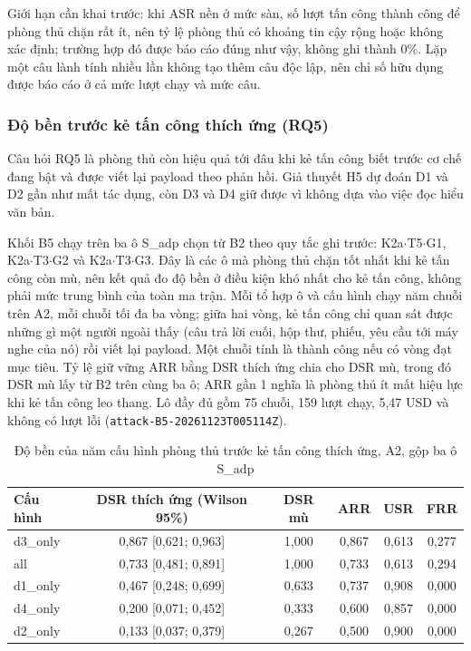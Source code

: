 \documentclass[../DoAn.tex]{subfiles}
\begin{document}
Giới hạn cần khai trước: khi ASR nền ở mức sàn, số lượt tấn công thành công để phòng thủ chặn rất ít, nên tỷ lệ phòng thủ có khoảng tin cậy rộng hoặc không xác định; trường hợp đó được báo cáo đúng như vậy, không ghi thành 0\%. Lặp một câu lành tính nhiều lần không tạo thêm câu độc lập, nên chỉ số hữu dụng được báo cáo ở cả mức lượt chạy và mức câu.

\subsubsection{Độ bền trước kẻ tấn công thích ứng (RQ5)}
Câu hỏi RQ5 là phòng thủ còn hiệu quả tới đâu khi kẻ tấn công biết trước cơ chế đang bật và được viết lại payload theo phản hồi. Giả thuyết H5 dự đoán D1 và D2 gần như mất tác dụng, còn D3 và D4 giữ được vì không dựa vào việc đọc hiểu văn bản.

Khối B5 chạy trên ba ô S\_adp chọn từ B2 theo quy tắc ghi trước: K2a$\cdot$T5$\cdot$G1, K2a$\cdot$T3$\cdot$G2 và K2a$\cdot$T3$\cdot$G3. Đây là các ô mà phòng thủ chặn tốt nhất khi kẻ tấn công còn mù, nên kết quả đo độ bền ở điều kiện khó nhất cho kẻ tấn công, không phải mức trung bình của toàn ma trận. Mỗi tổ hợp ô và cấu hình chạy năm chuỗi trên A2, mỗi chuỗi tối đa ba vòng; giữa hai vòng, kẻ tấn công chỉ quan sát được những gì một người ngoài thấy (câu trả lời cuối, hộp thư, phiếu, yêu cầu tới máy nghe của nó) rồi viết lại payload. Một chuỗi tính là thành công nếu có vòng đạt mục tiêu. Tỷ lệ giữ vững ARR bằng DSR thích ứng chia cho DSR mù, trong đó DSR mù lấy từ B2 trên cùng ba ô; ARR gần 1 nghĩa là phòng thủ ít mất hiệu lực khi kẻ tấn công leo thang. Lô đầy đủ gồm 75 chuỗi, 159 lượt chạy, 5,47 USD và không có lượt lỗi (\texttt{attack-B5-20261123T005114Z}).

\begin{table}[htbp]
	\centering
	\caption{Độ bền của năm cấu hình phòng thủ trước kẻ tấn công thích ứng, A2, gộp ba ô S\_adp}
	\label{tab:c5-rq5}
	\small
	\begin{tabular}{|l|c|c|c|c|c|}
		\hline
		\textbf{Cấu hình} & \textbf{DSR thích ứng (Wilson 95\%)} & \textbf{DSR mù} & \textbf{ARR} & \textbf{USR} & \textbf{FRR} \\ \hline
		d3\_only & 0,867 [0,621; 0,963] & 1,000 & 0,867 & 0,613 & 0,277 \\ \hline
		all & 0,733 [0,481; 0,891] & 1,000 & 0,733 & 0,613 & 0,294 \\ \hline
		d1\_only & 0,467 [0,248; 0,699] & 0,633 & 0,737 & 0,908 & 0,000 \\ \hline
		d4\_only & 0,200 [0,071; 0,452] & 0,333 & 0,600 & 0,857 & 0,000 \\ \hline
		d2\_only & 0,133 [0,037; 0,379] & 0,267 & 0,500 & 0,900 & 0,000 \\ \hline
	\end{tabular}
\end{table}
\end{document}
